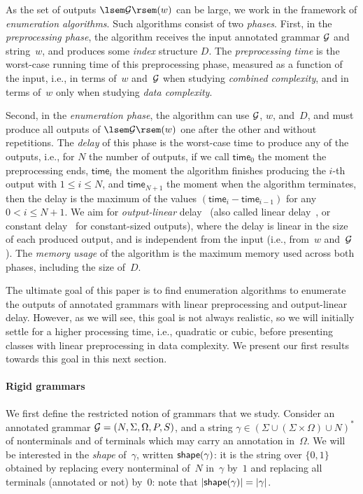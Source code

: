 As the set of outputs $\sem{\cG}(w)$ can be large, we
work in the framework of \emph{enumeration algorithms}.
Such algorithms consist of two \emph{phases}.
%
First, in the \emph{preprocessing phase},
the algorithm receives the input annotated grammar $\mathcal{G}$ and string~$w$, and produces some
\emph{index} structure $D$.
The \emph{preprocessing time} is the worst-case running time of this
preprocessing phase, measured as a function of the input, i.e., in terms of~$w$
and~$\mathcal{G}$ when studying \emph{combined complexity}, and in terms of~$w$ only
when studying \emph{data complexity}.

Second, in the \emph{enumeration phase}, the algorithm can use $\mathcal{G}$, $w$, and~$D$,
and must produce all outputs of $\sem{\cG}(w)$
one after the other and without
repetitions. The \emph{delay} of this phase is the worst-case time to
produce any of the outputs, i.e., for $N$ the number of outputs,
if we call $\mathsf{time}_0$ the moment the preprocessing ends, 
$\mathsf{time}_i$ the moment the algorithm finishes producing the $i$-th output
with $1 \leq i \leq N$, and 
$\mathsf{time}_{N+1}$ the moment when the algorithm terminates,
then the delay is the maximum of the values $(\mathsf{time}_i - \mathsf{time}_{i-1})$ for any 
$0 < i \leq N+1$.
We aim for \emph{output-linear} delay~\cite{FlorenzanoRUVV20} (also called linear delay~\cite{Courcelle09}, or constant delay~\cite{Segoufin13}
for constant-sized outputs), where the delay is
linear in the size of each produced output, and is independent from the input
(i.e., from~$w$ and~$\mathcal{G}$).
The \emph{memory usage} of the algorithm is the maximum memory
used across both phases, including the size of~$D$.

The ultimate goal of this paper is to find enumeration algorithms to enumerate
the outputs of annotated grammars
with linear preprocessing and
output-linear delay.  However, as we will see, this goal
is not always realistic, so we will initially settle for a higher
processing time, i.e., quadratic or cubic, before presenting classes with linear
preprocessing in data complexity.  We present our first results
towards this goal in this next section.


%
%

\paragraph{Rigid grammars}
We first define the restricted notion of grammars that we study.
%
Consider an annotated grammar $\mathcal{G} = (N, \Sigma, \Omega, P, S)$, and a string
$\gamma\in (\Sigma \cup (\Sigma \times \Omega)\cup N)^*$ of nonterminals and
of terminals which may carry an annotation in~$\Omega$. We will be interested in
the \emph{shape}
of~$\gamma$, written $\mathsf{shape}(\gamma)$: it is the string over $\{0, 1\}$
obtained by replacing every nonterminal of~$N$ in~$\gamma$ by~$1$ and replacing
all terminals (annotated or not) by~$0$: note that $|\mathsf{shape}(\gamma)| = |\gamma|$.

